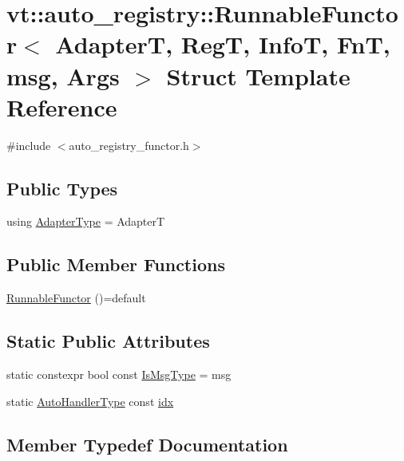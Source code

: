 \hypertarget{structvt_1_1auto__registry_1_1_runnable_functor}{}\section{vt\+:\+:auto\+\_\+registry\+:\+:Runnable\+Functor$<$ AdapterT, RegT, InfoT, FnT, msg, Args $>$ Struct Template Reference}
\label{structvt_1_1auto__registry_1_1_runnable_functor}


{\ttfamily \#include $<$auto\+\_\+registry\+\_\+functor.\+h$>$}

\subsection*{Public Types}
\begin{DoxyCompactItemize}
\item 
using \hyperlink{structvt_1_1auto__registry_1_1_runnable_functor_a9453e4491db65054b10e21b12658b1bc}{Adapter\+Type} = AdapterT
\end{DoxyCompactItemize}
\subsection*{Public Member Functions}
\begin{DoxyCompactItemize}
\item 
\hyperlink{structvt_1_1auto__registry_1_1_runnable_functor_a4dee5a83ee53d3f6a309d28091cfd6ff}{Runnable\+Functor} ()=default
\end{DoxyCompactItemize}
\subsection*{Static Public Attributes}
\begin{DoxyCompactItemize}
\item 
static constexpr bool const \hyperlink{structvt_1_1auto__registry_1_1_runnable_functor_a72e7d2e928c18ad46ee64f73c5dae509}{Is\+Msg\+Type} = msg
\item 
static \hyperlink{namespacevt_1_1auto__registry_ae295e18699146815bb7d7674594d95d7}{Auto\+Handler\+Type} const \hyperlink{structvt_1_1auto__registry_1_1_runnable_functor_ad96ef115f3351bfe2e256f87d303e57a}{idx}
\end{DoxyCompactItemize}


\subsection{Member Typedef Documentation}
\mbox{\label{structvt_1_1auto__registry_1_1_runnable_functor_a9453e4491db65054b10e21b12658b1bc}} 
